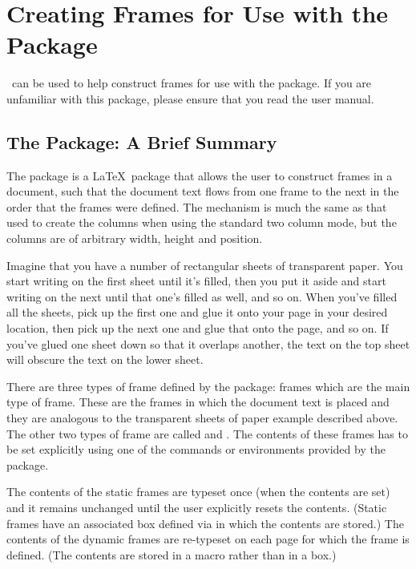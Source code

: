 
\section{Creating Frames for Use with the  Package}
\label{sec:flowframe}


\FlowframTk\ can be used to help construct frames for use with the
 package. If you are unfamiliar with this
package, please ensure that you read the user manual.

\subsection{The  Package: A Brief Summary}
\label{sec:flowframesummary}

The  package is a \LaTeX\ package that allows
the user to construct frames in a document, such that the document
text flows from one frame to the next in the order that the
frames were defined. The mechanism is much the same as that used
to create the columns when using the standard two column mode, but
the columns are of arbitrary width, height and position.

Imagine that you have a number of rectangular sheets of transparent
paper. You start writing on the first sheet until it's filled, then
you put it aside and start writing on the next until that one's
filled as well, and so on. When you've filled all the sheets, pick
up the first one and glue it onto your page in your desired
location, then pick up the next one and glue that onto the page, and
so on. If you've glued one sheet down so that it overlaps another,
the text on the top sheet will obscure the text on the lower sheet.

There are three types of frame defined by the 
package:  frames
which are the main type of frame. These are the frames in which the
document text is placed and they are analogous to the transparent
sheets of paper example described above. The other two types of frame are
called  and .  The contents of these frames has
to be set explicitly using one of the commands or environments
provided by the  package.

The contents of the static frames are typeset once (when the
contents are set) and it remains unchanged until the user explicitly
resets the contents. (Static frames have an associated box defined
via  in which the contents are stored.) The contents
of the dynamic frames are re-typeset on each page for which the
frame is defined. (The contents are stored in a macro rather than in
a box.)

